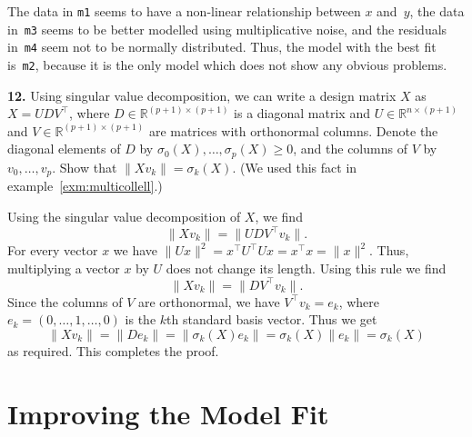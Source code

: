 \documentclass[
  a4paper,
]{article}
\theoremstyle{definition}
\theoremstyle{definition}
\theoremstyle{definition}
\theoremstyle{definition}
\theoremstyle{remark}
\begin{document}
\begin{myanswers}
The data in \texttt{m1} seems to
have a non-linear relationship between \(x\) and~\(y\), the data
in~\texttt{m3} seems to be better modelled using multiplicative noise,
and the residuals in~\texttt{m4} seem not to be normally
distributed. Thus, the model with the best fit is~\texttt{m2},
because it is the only model which does not show any obvious
problems.

\end{myanswers}

\textbf{12.} Using singular value decomposition,
we can write a design matrix \(X\) as \(X = U D V^\top\),
where \(D\in\mathbb{R}^{(p+1)\times(p+1)}\) is a diagonal matrix
and \(U\in\mathbb{R}^{n\times(p+1)}\) and \(V\in\mathbb{R}^{(p+1)\times(p+1)}\) are matrices with orthonormal columns.
Denote the diagonal elements of \(D\) by \(\sigma_0(X), \ldots, \sigma_p(X) \geq 0\),
and the columns of \(V\) by \(v_0, \ldots, v_p\).
Show that \(\| X v_k \| = \sigma_k(X)\).
(We used this fact in example~\ref{exm:multicollell}.)

\begin{myanswers}
Using the singular value decomposition of \(X\), we find
\begin{equation*}
  \| X v_k \|
  = \| U D V^\top v_k \|.
\end{equation*}
For every vector \(x\) we
have \(\| U x \|^2 = x^\top U^\top U x = x^\top x = \| x \|^2\).
Thus, multiplying a vector \(x\) by \(U\) does
not change its length. Using this rule we find
\begin{equation*}
  \| X v_k \|
  = \| D V^\top v_k \|.
\end{equation*}
Since the columns of \(V\) are orthonormal, we have \(V^\top v_k = e_k\),
where \(e_k = (0, \ldots, 1, \ldots, 0)\) is the \(k\)th standard basis vector.
Thus we get
\begin{equation*}
  \| X v_k \|
  = \| D e_k \|
  = \| \sigma_k(X) e_k \|
  = \sigma_k(X) \| e_k \|
  = \sigma_k(X)
\end{equation*}
as required. This completes the proof.

\end{myanswers}

\clearpage

\hypertarget{S11-improving}{%
\section{Improving the Model Fit}\label{S11-improving}}
\end{document}
